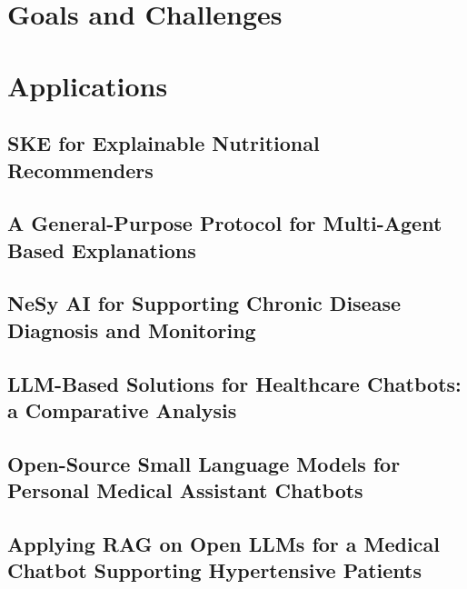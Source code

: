 \documentclass[12pt,a4paper,openright,twoside]{book}
\begin{document}
\section{Goals and Challenges}\label{sec:nesy-ai-goals-and-challenges}

\section{Applications}\label{sec:nesy-ai-applications}

\subsection{\Ac{SKE} for Explainable Nutritional Recommenders}\label{subsec:ske-for-explainable-nutritional-recommenders}

\subsection{A General-Purpose Protocol for Multi-Agent Based Explanations}\label{subsec:a-general-purpose-protocol-for-multi-agent-based-explanations}

\subsection{\Acl{NeSy} \ac{AI} for Supporting Chronic Disease Diagnosis and Monitoring}\label{subsec:nesy-ai-for-supporting-chronic-disease-diagnosis-and-monitoring}

\subsection{\Ac{LLM}-Based Solutions for Healthcare Chatbots: a Comparative Analysis}\label{subsec:llm-based-solutions-for-healthcare-chatbots-a-comparative-analysis}

\subsection{Open-Source Small Language Models for Personal Medical Assistant Chatbots}\label{subsec:open-source-small-language-models-for-personal-medical-assistant-chatbots}

\subsection{Applying \acl{RAG} on Open \acp{LLM} for a Medical Chatbot Supporting Hypertensive Patients}\label{subsec:applying-rag-on-open-llm-for-a-medical-chatbot-supporting-hypertensive-patients}
\end{document}

